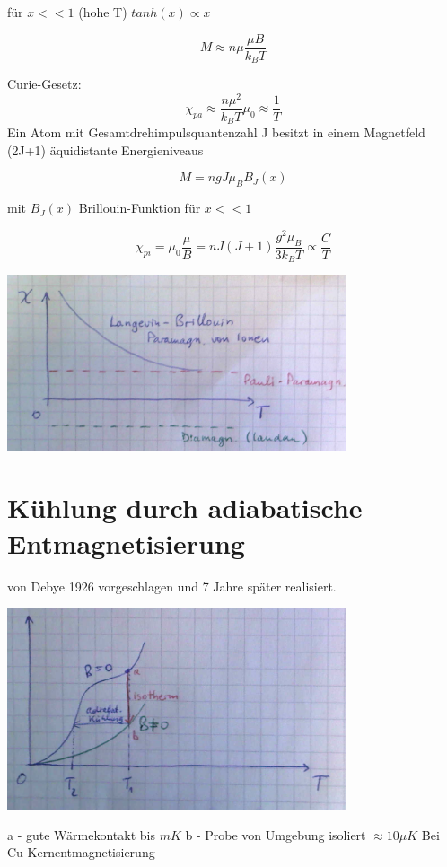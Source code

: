 für \(x<<1\) (hohe T) \(tanh(x)\propto x\)

\[M\approx n\mu \frac{\mu B}{k_B T}\]

Curie-Gesetz:
\[\chi_{pa}\approx \frac{n\mu^2}{k_BT}\mu_0\approx \frac{1}{T}\]
Ein Atom mit Gesamtdrehimpulsquantenzahl J besitzt in einem Magnetfeld (2J+1) äquidistante Energieniveaus

\[M = ngJ\mu_B B_J(x)\]

mit \( B_J(x) \) Brillouin-Funktion für \(x<<1\)

\[\chi_{pi} = \mu_0\frac{\mu}{B} = n J(J+1)\frac{g^2\mu_B}{3k_BT}\propto\frac{C}{T}\]

\includegraphics[width=0.75\textwidth]{kap12_07.png}

\section{Kühlung durch adiabatische Entmagnetisierung}

von Debye 1926 vorgeschlagen und 7 Jahre später realisiert.

\includegraphics[width=0.75\textwidth]{kap12_08.png}

a - gute Wärmekontakt bis \(mK\)
b - Probe von Umgebung isoliert \(\approx 10 \mu K\) Bei Cu Kernentmagnetisierung




